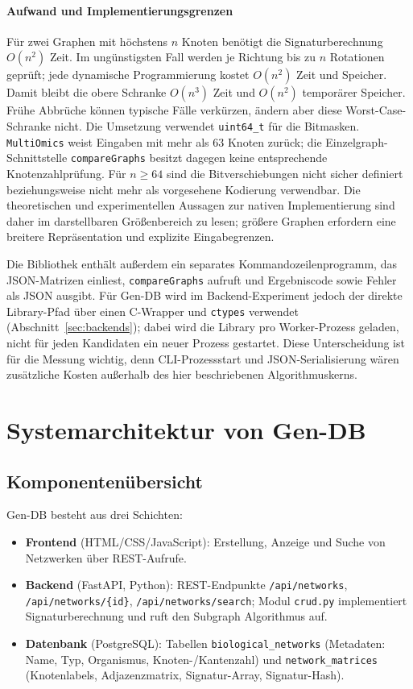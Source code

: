 \documentclass[a4paper,12pt, twoside]{report}
\theoremstyle{definition}
\begin{document}
\subsubsection*{Aufwand und Implementierungsgrenzen}

Für zwei Graphen mit höchstens $n$ Knoten benötigt die Signaturberechnung $O(n^2)$ Zeit. Im ungünstigsten Fall werden je Richtung bis zu $n$ Rotationen geprüft; jede dynamische Programmierung kostet $O(n^2)$ Zeit und Speicher. Damit bleibt die obere Schranke $O(n^3)$ Zeit und $O(n^2)$ temporärer Speicher. Frühe Abbrüche können typische Fälle verkürzen, ändern aber diese Worst-Case-Schranke nicht. Die Umsetzung verwendet \texttt{uint64\_t} für die Bitmasken. \texttt{MultiOmics} weist Eingaben mit mehr als $63$ Knoten zurück; die Einzelgraph-Schnittstelle \texttt{compareGraphs} besitzt dagegen keine entsprechende Knotenzahlprüfung. Für $n\ge64$ sind die Bitverschiebungen nicht sicher definiert beziehungsweise nicht mehr als vorgesehene Kodierung verwendbar. Die theoretischen und experimentellen Aussagen zur nativen Implementierung sind daher im darstellbaren Größenbereich zu lesen; größere Graphen erfordern eine breitere Repräsentation und explizite Eingabegrenzen.

Die Bibliothek enthält außerdem ein separates Kommandozeilenprogramm, das JSON-Matrizen einliest, \texttt{compareGraphs} aufruft und Ergebniscode sowie Fehler als JSON ausgibt. Für Gen-DB wird im Backend-Experiment jedoch der direkte Library-Pfad über einen C-Wrapper und \texttt{ctypes} verwendet (Abschnitt~\ref{sec:backends}); dabei wird die Library pro Worker-Prozess geladen, nicht für jeden Kandidaten ein neuer Prozess gestartet. Diese Unterscheidung ist für die Messung wichtig, denn CLI-Prozessstart und JSON-Serialisierung wären zusätzliche Kosten außerhalb des hier beschriebenen Algorithmuskerns.

\chapter{Systemarchitektur von Gen-DB}
\label{sec:architektur}

\section{Komponentenübersicht}

Gen-DB besteht aus drei Schichten:

\begin{itemize}
	\item \textbf{Frontend} (HTML/CSS/JavaScript): Erstellung, Anzeige und Suche von Netzwerken über REST-Aufrufe.
	\item \textbf{Backend} (FastAPI, Python): REST-Endpunkte \texttt{/api/networks}, \texttt{/api/networks/\{id\}}, \texttt{/api/networks/search}; Modul \texttt{crud.py} implementiert Signaturberechnung und ruft den Subgraph Algorithmus auf.
	\item \textbf{Datenbank} (PostgreSQL): Tabellen \texttt{biological\_networks} (Metadaten: Name, Typ, Organismus, Knoten-/Kantenzahl) und \texttt{network\_matrices} (Knotenlabels, Adjazenzmatrix, Signatur-Array, Signatur-Hash).
\end{itemize}
\end{document}
